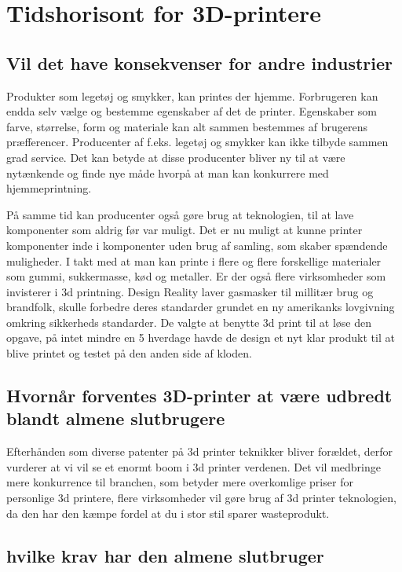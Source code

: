 
\chapter{Tidshorisont for 3D-printere}
\section{Vil det have konsekvenser for andre industrier}


Produkter som legetøj og smykker, kan printes der hjemme. Forbrugeren kan endda selv vælge og bestemme egenskaber af det de printer. Egenskaber som farve, størrelse, form og materiale kan alt sammen bestemmes af brugerens præfferencer. Producenter af f.eks. legetøj og smykker kan ikke tilbyde sammen grad service. Det kan betyde at disse producenter bliver ny til at være nytænkende og finde nye måde hvorpå at man kan konkurrere med hjemmeprintning.

På samme tid kan producenter også gøre brug at teknologien, til at lave komponenter som aldrig før var muligt. Det er nu muligt at kunne printer komponenter inde i komponenter uden brug af samling, som skaber spændende muligheder.
I takt med at man kan printe i flere og flere forskellige materialer som gummi, sukkermasse, kød og metaller. Er der også flere virksomheder som invisterer i 3d printning.
Design Reality laver gasmasker til millitær brug og brandfolk, skulle forbedre deres standarder grundet en ny amerikanks lovgivning omkring sikkerheds standarder. De valgte at benytte 3d print til at løse den opgave, på intet mindre en 5 hverdage havde de design et nyt klar produkt til at blive printet og testet på den anden side af kloden.\cite{gasmasker}

\section{Hvornår forventes 3D-printer at være udbredt blandt almene slutbrugere}

Efterhånden som diverse patenter på 3d printer teknikker bliver forældet, derfor vurderer \cite{manyika_disruptive_2013} at vi vil se et enormt boom i 3d printer verdenen. Det vil medbringe mere konkurrence til branchen, som betyder mere overkomlige priser for personlige 3d printere, flere virksomheder vil gøre brug af 3d printer teknologien, da den har den kæmpe fordel at du i stor stil sparer wasteprodukt. 

\section{hvilke krav har den almene slutbruger}

